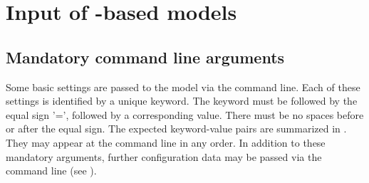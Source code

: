 \chapter{Input of -based models} \label{chap:input}
\renewcommand{\tabdir}{chapters/input/tab}
\renewcommand{\figdir}{chapters/input/fig}

\section{Mandatory command line arguments} \label{sec:input-commandline}

Some basic settings are passed to the model via the command line. Each of these settings is identified by a unique keyword. The keyword must be followed by the equal sign '=', followed by a corresponding value. There must be no spaces before or after the equal sign. The expected keyword-value pairs are summarized in . They may appear at the command line in any order. In addition to these mandatory arguments, further configuration data may be passed via the command line (see ).

